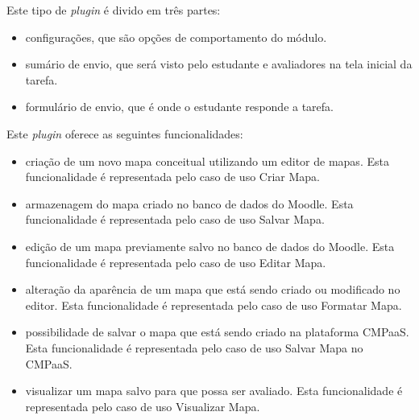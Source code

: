 \documentclass[
	12pt,				%
	openright,			%
	oneside,			%
	a4paper,			%
	english,			%
	french,				%
	spanish,			%
	brazil				%
	]{abntex2}
\begin{document}
Este tipo de \textit{plugin} é divido em três partes:
\begin{itemize}
	\item configurações, que são opções de comportamento do módulo.
	\item sumário de envio, que será visto pelo estudante e avaliadores na tela inicial da tarefa.
	\item formulário de envio, que é onde o estudante responde a tarefa.  
\end{itemize} 

%
Este \textit{plugin} oferece as seguintes funcionalidades:

\begin{itemize}
	\item criação de um novo mapa conceitual utilizando um editor de mapas. Esta funcionalidade é representada pelo caso de uso Criar Mapa.
	\item armazenagem do mapa criado no banco de dados do Moodle. Esta funcionalidade é representada pelo caso de uso Salvar Mapa.
	\item edição de um mapa previamente salvo no banco de dados do Moodle. Esta funcionalidade é representada pelo caso de uso Editar Mapa.
	\item alteração da aparência de um mapa que está sendo criado ou modificado no editor. Esta funcionalidade é representada pelo caso de uso Formatar Mapa.  
	\item possibilidade de salvar o mapa que está sendo criado na plataforma CMPaaS. Esta funcionalidade é representada pelo caso de uso Salvar Mapa no CMPaaS.  
	\item visualizar um mapa salvo para que possa ser avaliado. Esta funcionalidade é representada pelo caso de uso Visualizar Mapa.    
\end{itemize} 
\end{document}
